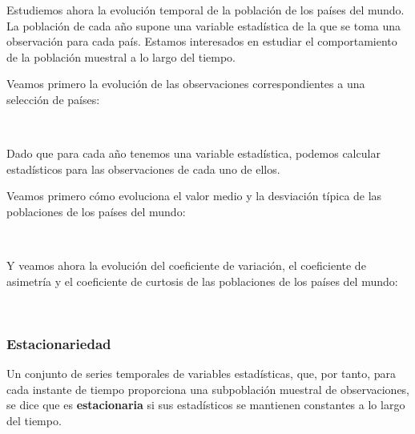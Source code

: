 \documentclass[11pt]{article}
\begin{document}
Estudiemos ahora la evolución temporal de la población de los países del
mundo. La población de cada año supone una variable estadística de la
que se toma una observación para cada país. Estamos interesados en
estudiar el comportamiento de la población muestral a lo largo del
tiempo.

Veamos primero la evolución de las observaciones correspondientes a una
selección de países:

    \begin{center}
    \end{center}
    { \hspace*{\fill} \\}
    
    Dado que para cada año tenemos una variable estadística, podemos
calcular estadísticos para las observaciones de cada uno de ellos.

Veamos primero cómo evoluciona el valor medio y la desviación típica de
las poblaciones de los países del mundo:

    \begin{center}
    \end{center}
    { \hspace*{\fill} \\}
    
    Y veamos ahora la evolución del coeficiente de variación, el coeficiente
de asimetría y el coeficiente de curtosis de las poblaciones de los
países del mundo:

    \begin{center}
    \end{center}
    { \hspace*{\fill} \\}
    
    \subsubsection*{Estacionariedad}\label{estacionariedad}

Un conjunto de series temporales de variables estadísticas, que, por
tanto, para cada instante de tiempo proporciona una subpoblación
muestral de observaciones, se dice que es \textbf{estacionaria} si sus
estadísticos se mantienen constantes a lo largo del tiempo.
\end{document}
